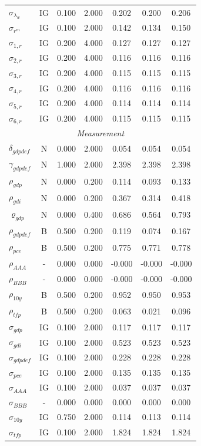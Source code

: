 \documentclass[12pt]{article}
\begin{document}
{\begin{longtable}{lcccccc}
$\sigma_{\lambda_w}$ & IG &    0.100 &    2.000 &    0.202 &    0.200 &    0.206 \\
$\sigma_{r^m}$ & IG &    0.100 &    2.000 &    0.142 &    0.134 &    0.150 \\
$\sigma_{1,r}$ & IG &    0.200 &    4.000 &    0.127 &    0.127 &    0.127 \\
$\sigma_{2,r}$ & IG &    0.200 &    4.000 &    0.116 &    0.116 &    0.116 \\
$\sigma_{3,r}$ & IG &    0.200 &    4.000 &    0.115 &    0.115 &    0.115 \\
$\sigma_{4,r}$ & IG &    0.200 &    4.000 &    0.116 &    0.116 &    0.116 \\
$\sigma_{5,r}$ & IG &    0.200 &    4.000 &    0.114 &    0.114 &    0.114 \\
$\sigma_{6,r}$ & IG &    0.200 &    4.000 &    0.115 &    0.115 &    0.115 \\
\multicolumn{7}{c}{\textit{Measurement}} \\[3pt]
$\delta_{gdpdef}$ & N &    0.000 &    2.000 &    0.054 &    0.054 &    0.054 \\
$\gamma_{gdpdef}$ & N &    1.000 &    2.000 &    2.398 &    2.398 &    2.398 \\
$\rho_{gdp}$ & N &    0.000 &    0.200 &    0.114 &    0.093 &    0.133 \\
$\rho_{gdi}$ & N &    0.000 &    0.200 &    0.367 &    0.314 &    0.418 \\
$\varrho_{gdp}$ & N &    0.000 &    0.400 &    0.686 &    0.564 &    0.793 \\
$\rho_{gdpdef}$ & B &    0.500 &    0.200 &    0.119 &    0.074 &    0.167 \\
$\rho_{pce}$ & B &    0.500 &    0.200 &    0.775 &    0.771 &    0.778 \\
$\rho_{AAA}$ & - &    0.000 &    0.000 &   -0.000 &   -0.000 &   -0.000 \\
$\rho_{BBB}$ & - &    0.000 &    0.000 &   -0.000 &   -0.000 &   -0.000 \\
$\rho_{10y}$ & B &    0.500 &    0.200 &    0.952 &    0.950 &    0.953 \\
$\rho_{tfp}$ & B &    0.500 &    0.200 &    0.063 &    0.021 &    0.096 \\
$\sigma_{gdp}$ & IG &    0.100 &    2.000 &    0.117 &    0.117 &    0.117 \\
$\sigma_{gdi}$ & IG &    0.100 &    2.000 &    0.523 &    0.523 &    0.523 \\
$\sigma_{gdpdef}$ & IG &    0.100 &    2.000 &    0.228 &    0.228 &    0.228 \\
$\sigma_{pce}$ & IG &    0.100 &    2.000 &    0.135 &    0.135 &    0.135 \\
$\sigma_{AAA}$ & IG &    0.100 &    2.000 &    0.037 &    0.037 &    0.037 \\
$\sigma_{BBB}$ & - &    0.000 &    0.000 &    0.000 &    0.000 &    0.000 \\
$\sigma_{10y}$ & IG &    0.750 &    2.000 &    0.114 &    0.113 &    0.114 \\
$\sigma_{tfp}$ & IG &    0.100 &    2.000 &    1.824 &    1.824 &    1.824 \\
\end{longtable}}
\end{document}
